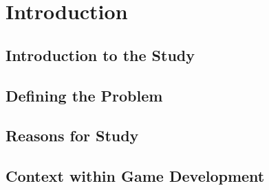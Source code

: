 \chapter{Introduction}

\section{Introduction to the Study}

\section{Defining the Problem}

\section{Reasons for Study}

\section{Context within Game Development}